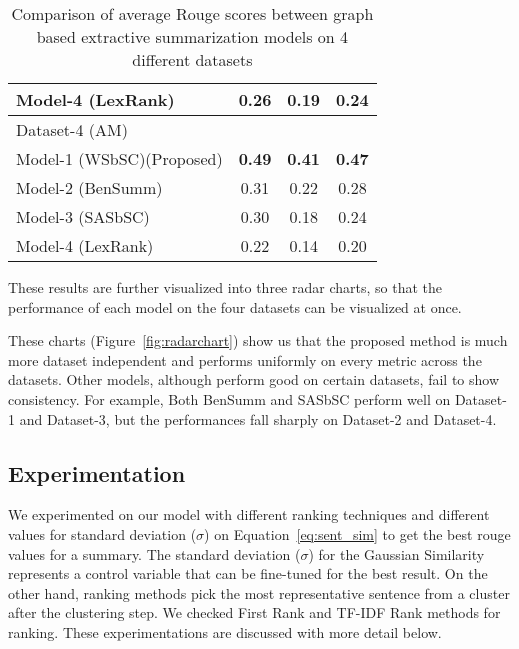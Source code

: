 \begin{table}[]
\begin{tabular}{lccc}
         Model-4 (LexRank)~\cite{Erkan-lexRank-2004}                    & 0.26          & 0.19          & 0.24          \\\hline
         Dataset-4 (AM)                                                 &               &               &               \\\hline
         Model-1 (WSbSC)(Proposed)                                      & \textbf{0.49} & \textbf{0.41} & \textbf{0.47} \\
         Model-2 (BenSumm)~\cite{chowdhury-etal-2021-tfidf-clustering}  & 0.31          & 0.22          & 0.28          \\
         Model-3 (SASbSC)~\cite{roychowdhury-etal-2022-spectral-base}   & 0.30          & 0.18          & 0.24          \\
         Model-4 (LexRank)~\cite{Erkan-lexRank-2004}                    & 0.22          & 0.14          & 0.20          \\
    \end{tabular}
    \caption{Comparison of average Rouge scores between graph based extractive summarization models on 4 different datasets}
    \label{tab:result_comparison-1}
\end{table}

These results are further visualized into three radar charts,
so that the performance of each model on the four datasets can be visualized at once.

These charts (Figure~\ref{fig:radarchart})
show us that the proposed method is much more dataset independent and performs
uniformly on every metric across the datasets.
Other models, although perform good on certain datasets, fail to show consistency.
For example, Both BenSumm and SASbSC perform well on Dataset-1 and Dataset-3, but
the performances fall sharply on Dataset-2 and Dataset-4.

\subsection{Experimentation}\label{subsec:experimentation}
We experimented on our model with different ranking techniques and different values for standard deviation ($\sigma$)
on Equation~\ref{eq:sent_sim} to get the best rouge values for a summary.
The standard deviation ($\sigma$) for the Gaussian Similarity represents a control variable
that can be fine-tuned for the best result.
On the other hand, ranking methods pick the most representative sentence from a cluster after the clustering step.
We checked First Rank and TF-IDF Rank methods for ranking.
These experimentations are discussed with more detail below.

